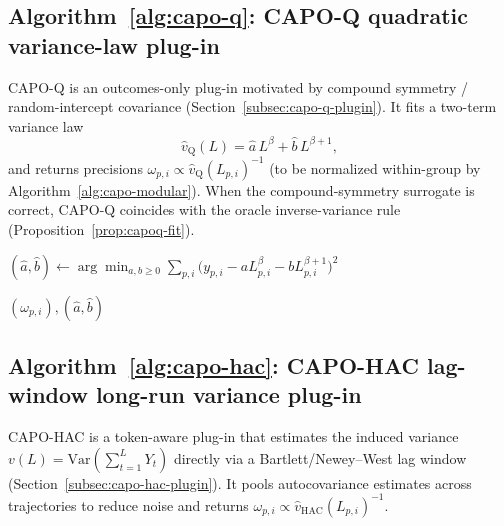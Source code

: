 \subsection{Algorithm~\ref{alg:capo-q}: CAPO-Q quadratic variance-law plug-in}
CAPO-Q is an outcomes-only plug-in motivated by compound symmetry / random-intercept covariance (Section~\ref{subsec:capo-q-plugin}). It fits a two-term variance law
\[
\widehat v_{\mathrm{Q}}(L)=\widehat a\,L^{\beta}+\widehat b\,L^{\beta+1},
\]
and returns precisions $\omega_{p,i}\propto \widehat v_{\mathrm{Q}}(L_{p,i})^{-1}$ (to be normalized within-group by Algorithm~\ref{alg:capo-modular}). When the compound-symmetry surrogate is correct, CAPO-Q coincides with the oracle inverse-variance rule (Proposition~\ref{prop:capoq-fit}).

\begin{algorithm}
\DontPrintSemicolon
\caption{CAPO-Q plug-in: fit a quadratic induced-variance law and return precisions}
\label{alg:capo-q}

$(\widehat a,\widehat b)\gets \arg\min_{a,b\ge 0}\sum_{p,i}\big(y_{p,i}-aL_{p,i}^{\beta}-bL_{p,i}^{\beta+1}\big)^2$\;

\Return $(\omega_{p,i}),(\widehat a,\widehat b)$\;
\end{algorithm}

\subsection{Algorithm~\ref{alg:capo-hac}: CAPO-HAC lag-window long-run variance plug-in}
CAPO-HAC is a token-aware plug-in that estimates the induced variance $v(L)=\mathrm{Var}(\sum_{t=1}^{L}Y_t)$ directly via a Bartlett/Newey--West lag window (Section~\ref{subsec:capo-hac-plugin}). It pools autocovariance estimates across trajectories to reduce noise and returns $\omega_{p,i}\propto \widehat v_{\mathrm{HAC}}(L_{p,i})^{-1}$.

